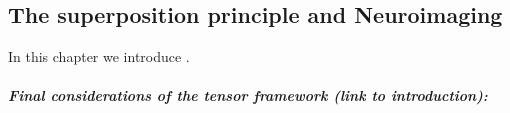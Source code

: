\begin{fullwidth}
\chapter{\label{ch:super_intro}
The superposition principle and Neuroimaging}
\end{fullwidth}

\begin{chabstract}

In this chapter we introduce .

\end{chabstract}


\paragraph{Final considerations of the tensor framework (link to introduction):}








